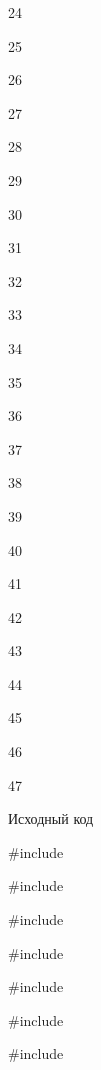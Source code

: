 \documentclass[a4paper,portrait,12pt]{article}
\begin{document}
24


25


26


27


28


29


30


31


32


33


34


35


36


37


38


39


40


41


42


43


44


45


46


47





\begin{flushleft}
Исходный код
\end{flushleft}





\begin{flushleft}
\#include
\end{flushleft}


\begin{flushleft}
\#include
\end{flushleft}


\begin{flushleft}
\#include
\end{flushleft}


\begin{flushleft}
\#include
\end{flushleft}


\begin{flushleft}
\#include
\end{flushleft}


\begin{flushleft}
\#include
\end{flushleft}


\begin{flushleft}
\#include
\end{flushleft}
\end{document}
